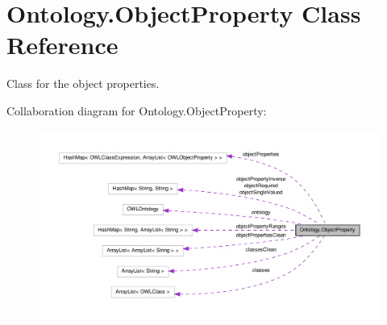 \hypertarget{class_ontology_1_1_object_property}{
\section{Ontology.ObjectProperty Class Reference}
\label{class_ontology_1_1_object_property}
}


Class for the object properties.  




Collaboration diagram for Ontology.ObjectProperty:\nopagebreak
\begin{figure}[H]
\begin{center}
\leavevmode
\includegraphics[width=400pt]{class_ontology_1_1_object_property__coll__graph}
\end{center}
\end{figure}
